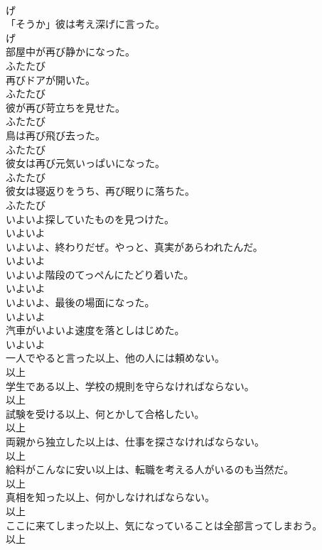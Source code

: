\documentclass[8pt]{extreport}
\begin{document}
\begin{CJK}{UTF8}{min}
\\	げ	
\\	「そうか」彼は考え深げに言った。	
\\	げ	
\\	部屋中が再び静かになった。	
\\	ふたたび	
\\	再びドアが開いた。	
\\	ふたたび	
\\	彼が再び苛立ちを見せた。	
\\	ふたたび	
\\	鳥は再び飛び去った。	
\\	ふたたび	
\\	彼女は再び元気いっぱいになった。	
\\	ふたたび	
\\	彼女は寝返りをうち、再び眠りに落ちた。	
\\	ふたたび	
\\	いよいよ探していたものを見つけた。	
\\	いよいよ	
\\	いよいよ、終わりだぜ。やっと、真実があらわれたんだ。	
\\	いよいよ	
\\	いよいよ階段のてっぺんにたどり着いた。	
\\	いよいよ	
\\	いよいよ、最後の場面になった。	
\\	いよいよ	
\\	汽車がいよいよ速度を落としはじめた。	
\\	いよいよ	
\\	一人でやると言った以上、他の人には頼めない。	
\\	以上	
\\	学生である以上、学校の規則を守らなければならない。	
\\	以上	
\\	試験を受ける以上、何とかして合格したい。	
\\	以上	
\\	両親から独立した以上は、仕事を探さなければならない。	
\\	以上	
\\	給料がこんなに安い以上は、転職を考える人がいるのも当然だ。	
\\	以上	
\\	真相を知った以上、何かしなければならない。	
\\	以上	
\\	ここに来てしまった以上、気になっていることは全部言ってしまおう。	
\\	以上	

\end{CJK}
\end{document}
